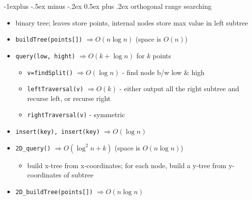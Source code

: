 \documentclass[10pt, landscape]{article}
\makeatletter
\renewcommand{\subsection}{\@startsection{subsection}{2}{0mm}%
                                {-1explus -.5ex minus -.2ex}%
                                {0.5ex plus .2ex}%
                                {\normalfont\normalsize\bfseries}}
\let\Then\Rightarrow
\newcommand{\code}[1]{\textcolor{mygreen}{\texttt{#1}}}
\makeatother
\begin{document}
\begin{multicols}{4}
\subsection{orthogonal range searching}
\begin{itemize}
    \item binary tree; leaves store points, internal nodes store max value in left subtree
    \item \code{buildTree(points[])} $\Then O(n \log n)$ \quad (space is $O(n)$)
    \item \code{query(low, hight)} $\Then O(k + \log n)$ for $k$ points
    \begin{itemize}
        \item \code{v=findSplit()} $\Then O(\log n)$ - find node b/w low \& high
        \item \code{leftTraversal(v)} $\Then O(k)$ - either output all the right subtree and recurse left, or recurse right 
        \item \code{rightTraversal(v)} - symmetric
    \end{itemize}
    \item \code{insert(key), insert(key)} $\Then O(\log n)$ 
    \item \code{2D\_query()} $\Then O(\log^2n + k)$ \quad (space is $O(n \log n)$)
    \begin{itemize}
        \item build x-tree from x-coordinates; for each node, build a y-tree from y-coordinates of subtree
    \end{itemize}
    \item \code{2D\_buildTree(points[])} $\Then O(n \log n)$
\end{itemize}


\end{multicols}
\end{document}
